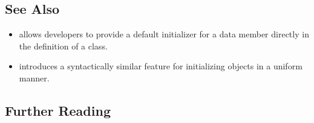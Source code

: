 \subsection[See Also]{See Also}\label{see-also}

\begin{itemize}
\item{allows developers to provide a default initializer for a data member directly in the definition of a class.}
\item{introduces a syntactically similar feature for initializing objects in a uniform manner.}
\end{itemize}

\subsection[Further Reading]{Further Reading}\label{further-reading}



